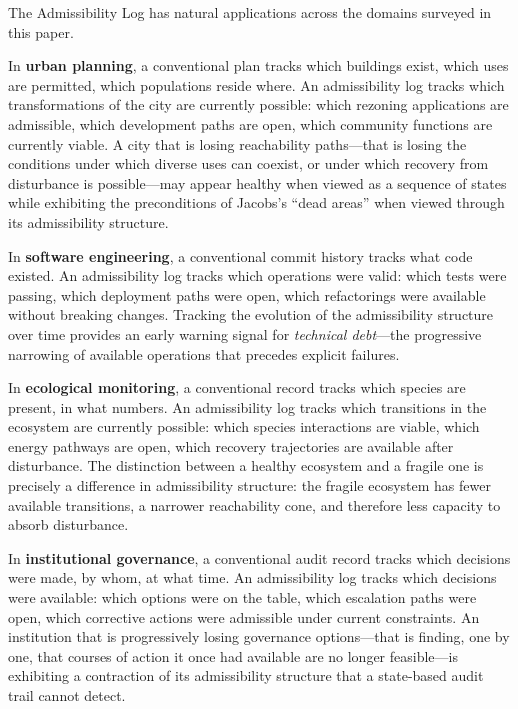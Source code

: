 \documentclass[12pt, a4paper]{article}
\theoremstyle{plain}
\theoremstyle{definition}
\theoremstyle{remark}
\begin{document}
The Admissibility Log has natural applications across the domains surveyed
in this paper.

In \textbf{urban planning}, a conventional plan tracks which buildings exist,
which uses are permitted, which populations reside where. An admissibility
log tracks which transformations of the city are currently possible: which
rezoning applications are admissible, which development paths are open, which
community functions are currently viable. A city that is losing reachability
paths---that is losing the conditions under which diverse uses can coexist,
or under which recovery from disturbance is possible---may appear healthy
when viewed as a sequence of states while exhibiting the preconditions of
Jacobs's ``dead areas'' when viewed through its admissibility structure.

In \textbf{software engineering}, a conventional commit history tracks what
code existed. An admissibility log tracks which operations were valid:
which tests were passing, which deployment paths were open, which refactorings
were available without breaking changes. Tracking the evolution of the
admissibility structure over time provides an early warning signal for
\emph{technical debt}---the progressive narrowing of available operations
that precedes explicit failures.

In \textbf{ecological monitoring}, a conventional record tracks which species
are present, in what numbers. An admissibility log tracks which transitions
in the ecosystem are currently possible: which species interactions are viable,
which energy pathways are open, which recovery trajectories are available
after disturbance. The distinction between a healthy ecosystem and a
fragile one is precisely a difference in admissibility structure: the
fragile ecosystem has fewer available transitions, a narrower reachability
cone, and therefore less capacity to absorb disturbance.

In \textbf{institutional governance}, a conventional audit record tracks
which decisions were made, by whom, at what time. An admissibility log
tracks which decisions were available: which options were on the table, which
escalation paths were open, which corrective actions were admissible under
current constraints. An institution that is progressively losing governance
options---that is finding, one by one, that courses of action it once had
available are no longer feasible---is exhibiting a contraction of its
admissibility structure that a state-based audit trail cannot detect.
\end{document}
